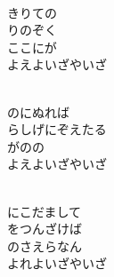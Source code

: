 \documentclass[10pt,b5j]{tarticle} %
\begin{document}
\vspace{1.5em} %
\newcommand{\linespace}{0.5em} %
\newcommand{\blocksize}{0.5\hsize} %
\newcommand{\itemmargin}{3em} %
\begin{enumerate} %
    \setlength{\itemindent}{\itemmargin} %
    \begin{minipage}[c]{\blocksize}
    
        \vspace{\linespace}
        \item~\\
        きりての\\
        りのぞく\\
        ここにが\\
        よえよいざやいざ
        
    \end{minipage}
    \begin{minipage}[c]{\blocksize}
        
        \vspace{\linespace}
        \item~\\
        のにぬれば\\
        らしげにぞえたる\\
        がのの\\
        よえよいざやいざ
        
    \end{minipage}
    \begin{minipage}[c]{\blocksize}
        
        \vspace{\linespace}
        \item~\\
        にこだまして\\
        をつんざけば\\
        のさえらなん\\
        よれよいざやいざ
        

\end{minipage}
\end{enumerate}
\end{document}
